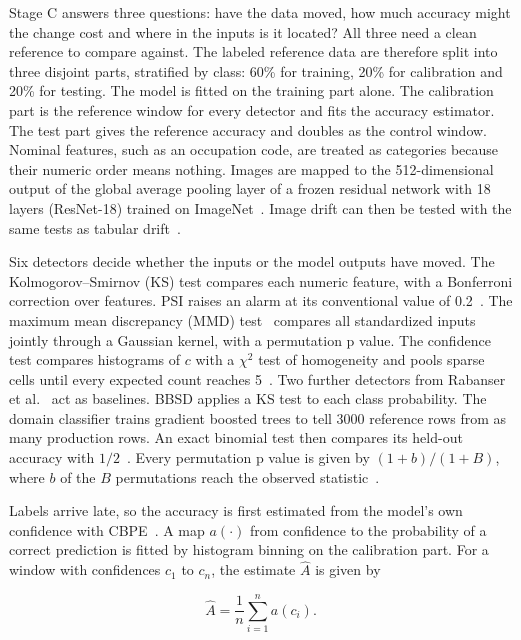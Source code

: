\documentclass[pdflatex,referee,lineno,sn-basic]{sn-jnl}
\begin{document}
Stage C answers three questions: have the data moved, how much accuracy might the change cost and where in the inputs is it located? All three need a clean reference to compare against. The labeled reference data are therefore split into three disjoint parts, stratified by class: 60\% for training, 20\% for calibration and 20\% for testing. The model is fitted on the training part alone. The calibration part is the reference window for every detector and fits the accuracy estimator. The test part gives the reference accuracy and doubles as the control window. Nominal features, such as an occupation code, are treated as categories because their numeric order means nothing. Images are mapped to the 512-dimensional output of the global average pooling layer of a frozen residual network with 18 layers (ResNet-18) trained on ImageNet~\citep{he2016deep}. Image drift can then be tested with the same tests as tabular drift~\citep{rabanser2019failing}.

Six detectors decide whether the inputs or the model outputs have moved. The Kolmogorov--Smirnov (KS) test compares each numeric feature, with a Bonferroni correction over features. PSI raises an alarm at its conventional value of 0.2~\citep{siddiqi2006}. The maximum mean discrepancy (MMD) test~\citep{gretton2012kernel} compares all standardized inputs jointly through a Gaussian kernel, with a permutation p value. The confidence test compares histograms of $c$ with a $\chi^2$ test of homogeneity and pools sparse cells until every expected count reaches 5~\citep{cochran1954}. Two further detectors from Rabanser et al.~\citeyearpar{rabanser2019failing} act as baselines. BBSD applies a KS test to each class probability. The domain classifier trains gradient boosted trees to tell 3000 reference rows from as many production rows. An exact binomial test then compares its held-out accuracy with $1/2$~\citep{lopezpaz2017c2st}. Every permutation p value is given by $(1+b)/(1+B)$, where $b$ of the $B$ permutations reach the observed statistic~\citep{phipson2010}.

Labels arrive late, so the accuracy is first estimated from the model's own confidence with CBPE~\citep{kivimaki2025performance}. A map $a(\cdot)$ from confidence to the probability of a correct prediction is fitted by histogram binning on the calibration part. For a window with confidences $c_1$ to $c_n$, the estimate $\hat A$ is given by

\begin{equation}
\hat A = \frac{1}{n}\sum_{i=1}^{n} a(c_i).\label{eq:cbpe}
\end{equation}
\end{document}
